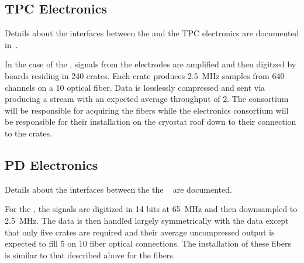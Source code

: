 
\subsection{TPC Electronics}
\label{sec:fd-daq-intfc-elec}

Details about the interfaces between the  and the 
 TPC electronics are documented in~\cite{docdb6778}.

In the case of the  , signals from the
 electrodes are amplified and then digitzed by 
boards residing in 240  crates. 
Each crate produces \SI{2.5}{\MHz} samples from 640 channels on a
\SI{10}{\Gbps} optical fiber. 
Data is losslessly compressed and sent via  producing a
stream with an expected average throughput of \SI{2}{\Gbps}.
The  consortium will be responsible for acquiring the fibers while
the \dual electronics consortium will be responsible for their
installation on the cryostat roof down to their connection to the
 crates.


\subsection{PD Electronics}
\label{sec:fd-daq-intfc-photon}

Details about the interfaces between the  the 
~\cite{docdb6802} are documented. 


For the  , the signals are digitized in 14 bits
at \SI{65}{\MHz} and then downsampled to \SI{2.5}{\MHz}. 
The data is then handled largely symmetrically with the 
data except that only five  crates are required and their
average uncompressed output is expected to fill \SI{5}{\Gbps} on
\SI{10}{\Gbps} fiber optical connections. 
The installation of these fibers is similar to that described above for the
 fibers.


